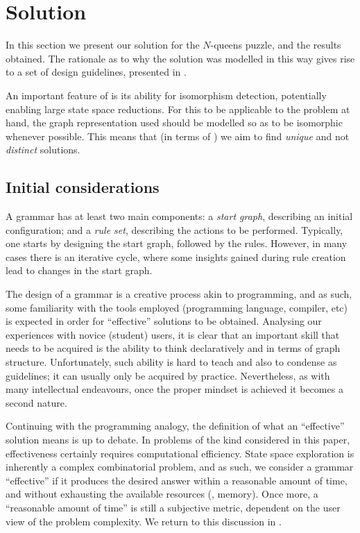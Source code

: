 
\section{Solution}

In this section we present our \GROOVE solution for the $N$-queens puzzle, and
the results obtained. The rationale as to why the solution was modelled in this
way gives rise to a set of design guidelines, presented in .

An important feature of \GROOVE is its ability for isomorphism detection,
potentially enabling large state space reductions. For this to be applicable to
the problem at hand, the graph representation used should be modelled so as to
be isomorphic whenever possible. This means that (in terms of
) we aim to find \emph{unique} and not \emph{distinct}
solutions.

\subsection{Initial considerations}

A \GROOVE grammar has at least two main components: a \emph{start graph},
describing an initial configuration; and a \emph{rule set}, describing the
actions to be performed. Typically, one starts by designing the start graph,
followed by the rules. However, in many cases there is an iterative cycle,
where some insights gained during rule creation lead to changes in the start
graph.

The design of a grammar is a creative process akin to programming, and as
such, some familiarity with the tools employed (programming language,
compiler, etc) is expected in order for ``effective'' solutions to be
obtained.  Analysing our experiences with novice (student) \GROOVE users, it
is clear that an important skill that needs to be acquired is the ability to
think declaratively and in terms of graph structure. Unfortunately, such
ability is hard to teach and also to condense as guidelines; it can usually
only be acquired by practice. Nevertheless, as with many intellectual
endeavours, once the proper mindset is achieved it becomes a second nature.

Continuing with the programming analogy, the definition of what an
``effective'' solution means is up to debate. In problems of the kind
considered in this paper, effectiveness certainly requires computational
efficiency. State space exploration is inherently a complex combinatorial
problem, and as such, we consider a grammar ``effective'' if it produces the
desired answer within a reasonable amount of time, and without exhausting the
available resources (\eg, memory). Once more, a ``reasonable amount of time''
is still a subjective metric, dependent on the user view of the problem
complexity. We return to this discussion in .

